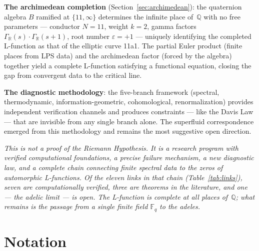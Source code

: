 \documentclass[12pt,reqno]{amsart}
\theoremstyle{plain}
\theoremstyle{definition}
\theoremstyle{remark}
\newcommand{\QQ}{\mathbb{Q}}
\newcommand{\RR}{\mathbb{R}}
\newcommand{\FF}{\mathbb{F}}
\begin{document}
\textbf{The archimedean completion} (Section~\ref{sec:archimedean}):
the quaternion algebra $B$ ramified at $\{11, \infty\}$ determines the
infinite place of~$\QQ$ with no free parameters --- conductor $N = 11$,
weight $k = 2$, gamma factors $\Gamma_\RR(s) \cdot \Gamma_\RR(s+1)$,
root number $\varepsilon = +1$ --- uniquely identifying the completed
L-function as that of the elliptic curve 11a1.  The partial Euler
product (finite places from LPS data) and the archimedean factor
(forced by the algebra) together yield a complete L-function satisfying
a functional equation, closing the gap from convergent data to the
critical line.

\textbf{The diagnostic methodology}: the five-branch framework
(spectral, thermodynamic, information-geometric, cohomological,
renormalization) provides independent verification channels and
produces constraints --- like the Davis Law --- that are invisible
from any single branch alone.  The superfluid correspondence emerged
from this methodology and remains the most suggestive open direction.

\medskip

\emph{This is not a proof of the Riemann Hypothesis.  It is a
research program with verified computational foundations, a precise
failure mechanism, a new diagnostic law, and a complete chain connecting
finite spectral data to the zeros of automorphic L-functions.  Of the
eleven links in that chain (Table~\ref{tab:links}), seven are
computationally verified, three are theorems in the literature, and
one --- the adelic limit --- is open.  The L-function is complete at
all places of~$\QQ$; what remains is the passage from a single
finite field $\FF_q$ to the adeles.}



\section*{Notation}
\end{document}
